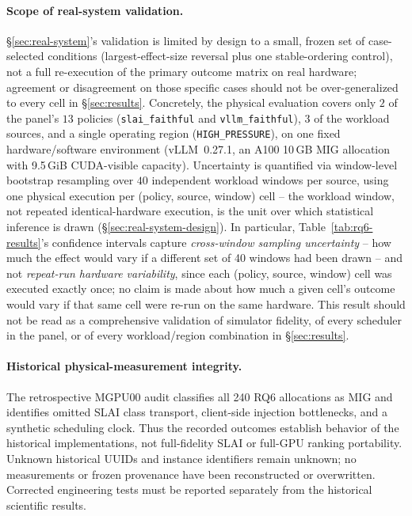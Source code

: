 \paragraph{Scope of real-system validation.} \S\ref{sec:real-system}'s
validation is limited by design to a small, frozen set of case-selected
conditions (largest-effect-size reversal plus one stable-ordering control),
not a full re-execution of the primary outcome matrix on real hardware; agreement
or disagreement on those specific cases should not be over-generalized to
every cell in \S\ref{sec:results}. Concretely, the physical evaluation
covers only $2$ of the panel's $13$ policies (\texttt{slai\_faithful} and
\texttt{vllm\_faithful}), $3$ of the workload sources, and a single
operating region (\texttt{HIGH\_PRESSURE}), on one fixed
hardware/software environment (vLLM~0.27.1, an A100 10\,GB MIG
allocation with 9.5\,GiB CUDA-visible capacity). Uncertainty is quantified via window-level bootstrap
resampling over $40$ independent workload windows per source, using one
physical execution per (policy, source, window) cell -- the workload
window, not repeated identical-hardware execution, is the unit over which
statistical inference is drawn (\S\ref{sec:real-system-design}). In
particular, Table~\ref{tab:rq6-results}'s confidence intervals capture
\emph{cross-window sampling uncertainty} -- how much the effect would vary
if a different set of 40 windows had been drawn -- and not
\emph{repeat-run hardware variability}, since each (policy, source, window)
cell was executed exactly once; no claim is made about how much a given
cell's outcome would vary if that same cell were re-run on the same
hardware. This result should not be read as a comprehensive validation of
simulator fidelity, of every scheduler in the panel, or of every
workload/region combination in \S\ref{sec:results}.

\paragraph{Historical physical-measurement integrity.} The retrospective MGPU00 audit classifies all 240 RQ6 allocations as MIG and identifies omitted SLAI class transport, client-side injection bottlenecks, and a synthetic scheduling clock. Thus the recorded outcomes establish behavior of the historical implementations, not full-fidelity SLAI or full-GPU ranking portability. Unknown historical UUIDs and instance identifiers remain unknown; no measurements or frozen provenance have been reconstructed or overwritten. Corrected engineering tests must be reported separately from the historical scientific results.
